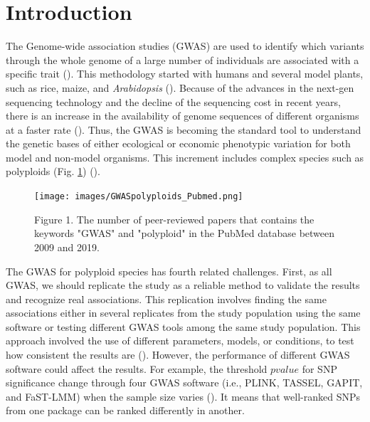 \documentclass{article}
\begin{document}
\section{Introduction}

The Genome-wide association studies (GWAS) are used to identify which variants through the whole genome of a large number of individuals are associated with a specific trait (\cite{cantor2010prioritizing,begum2012comprehensive}). This methodology started with humans and several model plants, such as rice, maize, and \emph{Arabidopsis} (\cite{lauc2010genomics,tian2011genome,cao2011whole,korte2013advantages,han2013sequencing}). Because of the advances in the next-gen sequencing technology and the decline of the sequencing cost in recent years, there is an increase in the availability of genome sequences of different organisms at a faster rate (\cite{ekblom2011applications,ellegren2014genome}). Thus, the GWAS is becoming the standard tool to understand the genetic bases of either ecological or economic phenotypic variation for both model and non-model organisms. This increment includes complex species such as polyploids (Fig. \ref{GWASpolyploids}) (\cite{ekblom2011applications,santure2018wild}).

\begin{figure}[H]
\begin{centering}
\texttt{[image: images/GWASpolyploids\_Pubmed.png]} 
\par\end{centering}
\centering{}\caption{Figure 1. The number of peer-reviewed papers that contains the keywords "GWAS" and "polyploid" in the PubMed database between 2009 and 2019.\label{GWASpolyploids}}
\end{figure}

The GWAS for polyploid species has fourth related challenges. First, as all GWAS, we should replicate the study as a reliable method to validate the results and recognize real associations. This replication involves finding the same associations either in several replicates from the study population using the same software or testing different GWAS tools among the same study population. This approach involved the use of different parameters, models, or conditions, to test how consistent the results are (\cite{De2014, Pearson2008}). However, the performance of different GWAS software could affect the results. For example, the threshold $pvalue$ for SNP significance change through four GWAS software (i.e., PLINK, TASSEL, GAPIT, and FaST-LMM) when the sample size varies (\cite{Yan2019}). It means that well-ranked SNPs from one package can be ranked differently in another.
\end{document}
